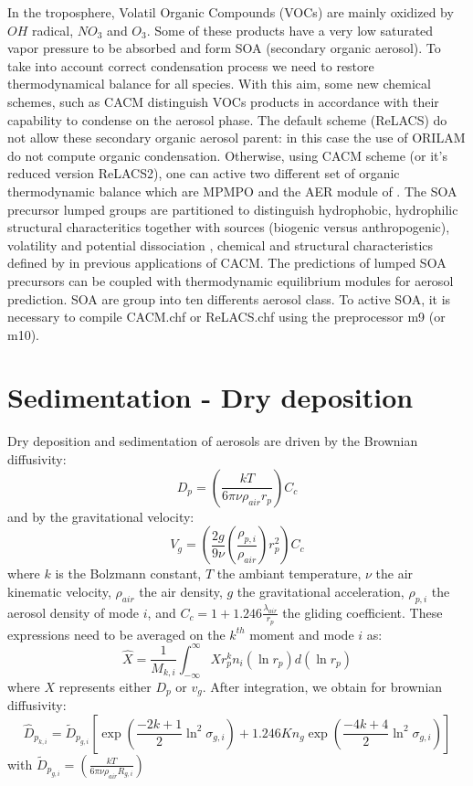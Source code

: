 In the troposphere, Volatil Organic Compounds (VOCs) are mainly oxidized by $OH$ 
radical, $NO_3$ and $O_3$. Some of these products have a very low 
saturated vapor pressure to be absorbed and form SOA (secondary organic aerosol).
To take into account correct condensation process we need to restore 
thermodynamical balance for all species. 
With this aim, some new chemical schemes, such as CACM \citep{Griffin-2002a} 
distinguish VOCs products in
accordance with their capability to condense on the aerosol phase.
The default scheme (ReLACS) do not allow these secondary organic aerosol parent:
in this case the use of ORILAM do not compute organic condensation.
Otherwise, using CACM scheme (or it's reduced version ReLACS2), one can active two
different set of organic thermodynamic balance which are MPMPO \citep{Griffin-2005} and the AER module of \citet{Pun-2002}.  The SOA precursor lumped groups are partitioned to distinguish hydrophobic, hydrophilic structural characteritics \citep{Pun-2002} together with sources (biogenic versus anthropogenic), volatility and potential dissociation  \citep{Griffin-2005},  chemical and structural characteristics defined by \citep{Pun-2002} in previous applications of CACM.  The predictions of lumped SOA precursors can be coupled with thermodynamic equilibrium modules for aerosol prediction.  SOA are group into ten differents aerosol class.
To active SOA, it is necessary to compile CACM.chf or ReLACS.chf using the preprocessor m9 (or m10).

\section{Sedimentation - Dry deposition}
Dry deposition and sedimentation of aerosols are driven by the Brownian 
diffusivity:
\begin{equation}
D_p = \left(\frac{k T}{6 \pi \nu \rho_{air} r_p} \right) C_c
\label{diff_bro}
\end{equation}
and by  the gravitational velocity:
\begin{equation}
V_g = \left(\frac{2 g}{9 \nu}\left(\frac{\rho_{p,i}}{\rho_{air}}\right) r_p^2 
\right) C_c
\label{vitesse_grav}
\end{equation}
where $k$ is the Bolzmann constant, $T$ the ambiant temperature, $\nu$ the air 
kinematic velocity, $\rho_{air}$ the air density, $g$ the gravitational 
acceleration, $\rho_{p,i}$ the aerosol density of mode $i$, and $C_c = 1 + 
1.246\frac{\lambda_{air}}{r_p}$ the gliding coefficient. 
These expressions need to be averaged on the $k^{th}$ moment and mode $i$ as:
\begin{equation}
\hat{X} = \frac{1}{M_{k,i}} \int_{-\infty}^{\infty} X r^k_p n_i(\ln r_p)d(\ln r_p)
\label{moyenne}
\end{equation}
where $X$ represents either $D_p$ or $v_g$.
After integration, we obtain for  brownian diffusivity:
\begin{equation}
\hat{D}_{p_{k,i}} = \tilde{D}_{p_{g,i}}\left[\exp\left(\frac{-2k+1}{2} 
\ln^2\sigma_{g,i} \right) + 1.246 Kn_g 
\exp \left(\frac{-4k+4}{2} \ln^2\sigma_{g,i}\right) \right]
\label{diff_brow}
\end{equation}
with $\tilde{D}_{p_{g,i}} = \left(\frac{kT}{6 \pi \nu \rho_{air} R_{g,i}} 
\right)$

